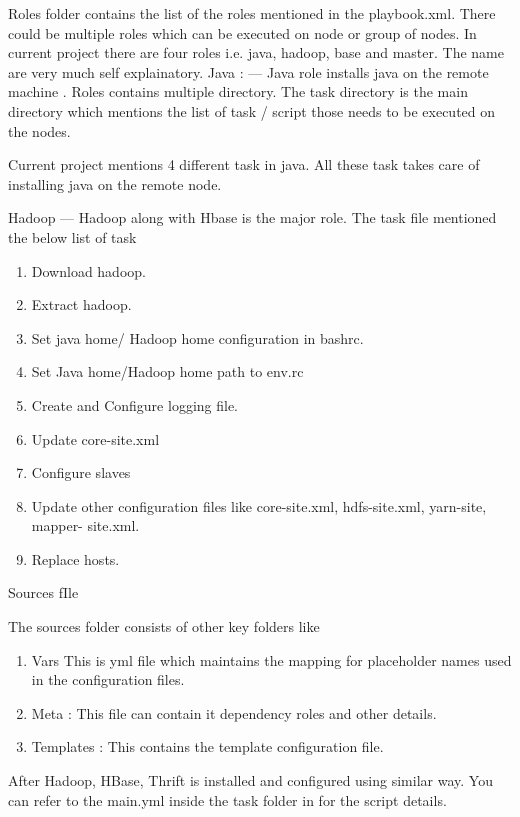 \documentclass[9pt,twocolumn,twoside]{../../styles/osajnl}
\begin{document}
Roles folder contains the list of the roles mentioned in the playbook.xml. There could be multiple roles which can be executed on node or group of nodes.
In current project there are four roles i.e. java, hadoop, base and master. The name are very much self explainatory.
Java : — Java role installs java on the remote machine . Roles contains multiple directory. The task directory is the main directory which mentions the list of task / script 
those needs to be executed on the nodes.

Current project mentions 4 different task in java. All these task takes care of installing java on the remote node.

Hadoop — Hadoop along with Hbase is the major role. The task file mentioned the below list of task
\begin{enumerate}
\item Download hadoop.
\item Extract hadoop.
\item Set java home/ Hadoop home configuration in bashrc.
\item Set Java home/Hadoop home path to env.rc
\item Create and Configure logging file.
\item Update core-site.xml
\item Configure slaves
\item Update other configuration files like core-site.xml, hdfs-site.xml, yarn-site, mapper- site.xml.
\item Replace hosts.
\end{enumerate}

Sources fIle

The sources folder consists of other key folders like

\begin{enumerate}
\item Vars This is yml file which maintains the mapping for placeholder names used in the configuration files.
\item Meta : This file can contain it dependency roles and other details.
\item Templates : This contains the template configuration file.
\end{enumerate}

After Hadoop, HBase, Thrift is installed and configured using similar way. You can refer to the main.yml inside the task folder in for the script details.
\end{document}
